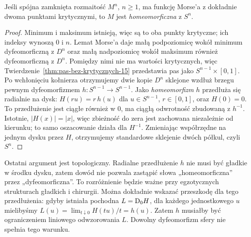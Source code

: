 \begin{twierdzenie}
\label{thm:reeb-morse-17}
Jeśli spójna zamknięta rozmaitość
$M^n$, $n\geq1$, ma funkcję
Morse'a z dokładnie dwoma
punktami krytycznymi, to
$M$ jest \emph{homeomorficzna}
z $S^n$.
\end{twierdzenie}
\begin{proof}
Minimum i maksimum istnieją,
więc są to oba punkty krytyczne;
ich indeksy wynoszą $0$ i $n$.
Lemat Morse'a daje małą
podpoziomicę wokół minimum
dyfeomorficzną z $D^n$ oraz
małą nadpoziomicę wokół maksimum
również dyfeomorficzną z $D^n$.
Pomiędzy nimi nie ma wartości
krytycznych, więc
Twierdzenie~\ref{thm:pas-bez-krytycznych-15}
przedstawia pas jako
$S^{n-1}\times[0,1]$.
Po wchłonięciu kołnierza
otrzymujemy dwie kopie $D^n$
sklejone wzdłuż brzegu
pewnym dyfeomorfizmem
$h:S^{n-1}\to S^{n-1}$.
Jako \emph{homeomorfizm}
$h$ przedłuża się radialnie
na dysk:
$H(ru)=r\,h(u)$ dla
$u\in S^{n-1}$, $r\in[0,1]$,
oraz $H(0)=0$.
To przedłużenie jest ciągłe
również w $0$, ma ciągłą
odwrotność zbudowaną z $h^{-1}$.
Istotnie, $|H(x)|=|x|$, więc zbieżność do zera jest zachowana
niezależnie od kierunku; to samo oszacowanie działa dla $H^{-1}$.
Zmieniając współrzędne
na jednym dysku przez $H$,
otrzymujemy standardowe
sklejenie dwóch półkul,
czyli $S^n$.
\end{proof}

\begin{uwaga}
Ostatni argument jest topologiczny.
Radialne przedłużenie $h$ nie musi być
gładkie w środku dysku, zatem dowód
nie pozwala zastąpić słowa
„homeomorficzna” przez
„dyfeomorficzna”. To rozróżnienie
będzie ważne przy egzotycznych
strukturach gładkich i chirurgii.
Można dokładnie wskazać przeszkodę dla tego przedłużenia:
gdyby istniała pochodna $L=\mathrm D_0H$, dla każdego jednostkowego $u$
mielibyśmy $L(u)=\lim_{t\downarrow0}H(tu)/t=h(u)$.
Zatem $h$ musiałby być ograniczeniem liniowego odwzorowania $L$.
Dowolny dyfeomorfizm sfery nie spełnia tego warunku.
\end{uwaga}


